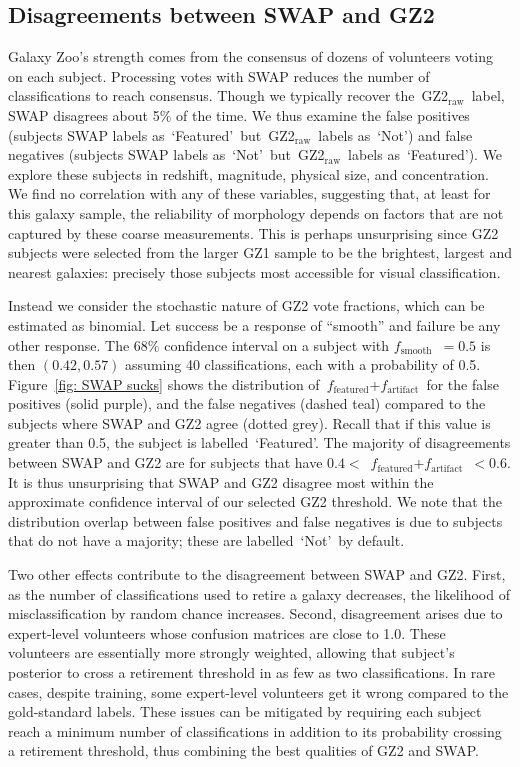 \documentclass[twocolumn,  trackchanges,]{aastex6}%
\newcommand{\feat}{`Featured'}
\newcommand{\notfeat}{`Not'}
\newcommand{\raw}{GZ2$_{\text{raw}}$}
\newcommand{\ffeat}{$f_{\mathrm{featured}}$}
\newcommand{\fsmooth}{$f_{\mathrm{smooth}}$}
\newcommand{\fstar}{$f_{\mathrm{artifact}}$}
\begin{document}
\subsection{Disagreements between SWAP and GZ2}\label{sec: swap gz2 disagree}

Galaxy Zoo's strength comes from the consensus of dozens of volunteers voting on each subject. 
Processing votes with SWAP reduces the number of classifications to reach consensus. 
Though we typically recover the~\raw~label, SWAP disagrees about 5\% of the time. 
We thus examine the false positives (subjects SWAP labels as~\feat~but~\raw~labels as~\notfeat) and false negatives (subjects SWAP labels as~\notfeat~but~\raw~labels as~\feat).
We explore these subjects in redshift, magnitude, physical size, and concentration. We find no correlation with any of these variables, suggesting that, at least for this galaxy sample, the reliability of morphology depends on factors that are not captured by these coarse measurements.
This is perhaps unsurprising since GZ2 subjects were selected from the larger GZ1 sample to be the brightest, largest and nearest galaxies:  precisely those subjects most accessible for visual classification. 

Instead we consider the stochastic nature of GZ2 vote fractions, which can be estimated as binomial. Let success be a response of ``smooth'' and failure be any other response. The $68\%$ confidence interval on a subject with \fsmooth~$=0.5$ is then $(0.42, 0.57)$ assuming 40 classifications, each with a probability of 0.5.
Figure~\ref{fig: SWAP sucks} shows the distribution of~\ffeat+\fstar~for the false positives (solid purple), and the false negatives (dashed teal) compared to the
 subjects where SWAP and GZ2 agree (dotted grey).  
Recall that if this value is greater than 0.5, the subject is labelled~\feat.  
The majority of disagreements between SWAP and GZ2 are for
subjects that have $0.4 <$~\ffeat+\fstar~$< 0.6$. It is thus unsurprising that SWAP and GZ2 disagree most within the approximate confidence interval of our selected GZ2 threshold.
We note that the distribution overlap between false positives and false negatives is due to subjects that do not have a majority;
these are labelled~\notfeat~by default. 


Two other effects contribute to the disagreement between SWAP and GZ2. 
First, as the number of classifications used to retire a galaxy decreases, the 
likelihood of misclassification by random chance increases. 
Second, disagreement arises due to expert-level volunteers whose confusion 
matrices are close to 1.0. These volunteers are essentially more 
strongly weighted, allowing that subject's posterior to cross a retirement threshold
in as few as two classifications. In rare cases, despite training, some expert-level 
volunteers get it wrong compared to the gold-standard labels. These issues can be mitigated by requiring each subject reach 
a minimum number of classifications in addition to its probability crossing a
retirement threshold, thus combining the best qualities of GZ2 and SWAP. 
\end{document}
